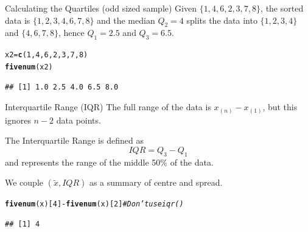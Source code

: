 \documentclass[t,xcolor=pdftex,dvipsnames,table]{beamer}\usepackage[]{graphicx}\usepackage[]{color}
\makeatletter
\newcommand{\hlnum}[1]{\textcolor[rgb]{0.686,0.059,0.569}{#1}}%
\newcommand{\hlcom}[1]{\textcolor[rgb]{0.678,0.584,0.686}{\textit{#1}}}%
\newcommand{\hlopt}[1]{\textcolor[rgb]{0,0,0}{#1}}%
\newcommand{\hlstd}[1]{\textcolor[rgb]{0.345,0.345,0.345}{#1}}%
\newcommand{\hlkwb}[1]{\textcolor[rgb]{0.69,0.353,0.396}{#1}}%
\newcommand{\hlkwd}[1]{\textcolor[rgb]{0.737,0.353,0.396}{\textbf{#1}}}%
\newenvironment{kframe}{%
 \def\at@end@of@kframe{}%
 \ifinner\ifhmode%
  \def\at@end@of@kframe{\end{minipage}}%
  \begin{minipage}{\columnwidth}%
 \fi\fi%
 \def\FrameCommand##1{\hskip\@totalleftmargin \hskip-\fboxsep
 \colorbox{shadecolor}{##1}\hskip-\fboxsep
     \hskip-\linewidth \hskip-\@totalleftmargin \hskip\columnwidth}%
 \MakeFramed {\advance\hsize-\width
   \@totalleftmargin\z@ \linewidth\hsize
   \@setminipage}}%
 {\par\unskip\endMakeFramed%
 \at@end@of@kframe}
\newenvironment{knitrout}{}{} %
\makeatother
\begin{document}
\begin{frame}[fragile]{}
\begin{block}{Calculating the Quartiles (odd sized sample)}
Given $\{ 1,4,6,2,3,7,8\}$, the sorted data is $\{ 1,2,3,4,6,7,8 \}$ and the median $Q_{2} = 4$ splits the data into $\{ 1,2,3,4 \}$ and $\{ 4,6,7,8 \}$, hence $Q_{1} = 2.5$ and $Q_{3} = 6.5$.
\end{block}

\begin{knitrout}
\color{fgcolor}\begin{kframe}
\begin{alltt}
\hlstd{x2}\hlkwb{=}\hlkwd{c}\hlstd{(}\hlnum{1}\hlstd{,}\hlnum{4}\hlstd{,}\hlnum{6}\hlstd{,}\hlnum{2}\hlstd{,}\hlnum{3}\hlstd{,}\hlnum{7}\hlstd{,}\hlnum{8}\hlstd{)}
\hlkwd{fivenum}\hlstd{(x2)}
\end{alltt}
\begin{verbatim}
## [1] 1.0 2.5 4.0 6.5 8.0
\end{verbatim}
\end{kframe}
\end{knitrout}
\end{frame}


\begin{frame}[fragile]{Interquartile Range (IQR)}
The full range of the data is $x_{(n)} - x_{(1)}$, but this ignores $n-2$ data points.

\vspace{.5cm}
The Interquartile Range is defined as
\[ IQR = Q_{3} -Q_{1} \]
and represents the range of the middle 50\% of the data. 

\vspace{.5cm}
We couple $(\tilde{x}, IQR)$ as a summary of centre and spread.
\begin{knitrout}
\color{fgcolor}\begin{kframe}
\begin{alltt}
\hlkwd{fivenum}\hlstd{(x)[}\hlnum{4}\hlstd{]}\hlopt{-}\hlkwd{fivenum}\hlstd{(x)[}\hlnum{2}\hlstd{]}   \hlcom{# Don't use iqr()}
\end{alltt}
\begin{verbatim}
## [1] 4
\end{verbatim}
\end{kframe}
\end{knitrout}
\end{frame}
\end{document}
